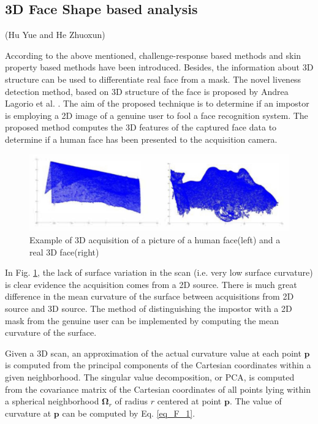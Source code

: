\documentclass[journal]{IEEEtran}
\begin{document}
\subsection{3D Face Shape based analysis}

(Hu Yue and He Zhuoxun)

According to the above mentioned, challenge-response based methods and skin property based methods have been introduced. Besides, the information about 3D structure can be used to differentiate real face from a mask. The novel liveness detection method, based on 3D structure of the face is proposed by Andrea Lagorio et al. \cite{lagorio2013liveness}. The aim of the proposed technique is to determine if an impostor is employing a 2D image of a genuine user to fool a face recognition system. The proposed method computes the 3D features of the captured face data to determine if a human face has been presented to the acquisition camera.

\begin{figure}[!t]
\centering
\includegraphics[width=1\linewidth]{img/F_1}
\caption{Example of 3D acquisition of a picture of a human face(left) and a real 3D face(right)}
\label{fig_F_1}
\end{figure}

In Fig. \ref{fig_F_1}, the lack of surface variation in the scan (i.e. very low surface curvature) is clear evidence the acquisition comes from a 2D source. There is much great difference in the mean curvature of the surface between acquisitions from 2D source and 3D source. The method of distinguishing the impostor with a 2D mask from the genuine user can be implemented by computing the mean curvature of the surface.

Given a 3D scan, an approximation of the actual curvature value at each point $\mathbf{p}$ is computed from the principal components of the Cartesian coordinates within a given neighborhood. The singular value decomposition, or PCA, is computed from the covariance matrix of the Cartesian coordinates of all points lying within a spherical neighborhood $\mathbf{\Omega}_r$ of radius $r$ centered at point $\mathbf{p}$. The value of curvature at $\mathbf{p}$ can be computed by Eq. \ref{eq_F_1}.  
\end{document}
